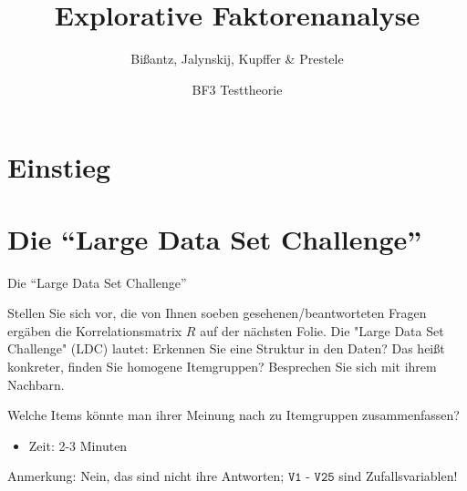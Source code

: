 \documentclass[
  ignorenonframetext,
]{beamer}
\title{Explorative Faktorenanalyse}
\subtitle{Bißantz, Jalynskij, Kupffer \& Prestele}
\author{BF3 Testtheorie}
\date{}
\providecommand{\tightlist}{%
  \setlength{\itemsep}{0pt}\setlength{\parskip}{0pt}}
\begin{document}
\frame{\titlepage}

\begin{frame}[allowframebreaks]
  \tableofcontents[hideallsubsections]
\end{frame}
\hypertarget{einstieg}{%
\section*{Einstieg}\label{einstieg}}


\hypertarget{die-large-data-set-challenge}{%
\section{Die ``Large Data Set
Challenge''}\label{die-large-data-set-challenge}}

\begin{frame}{Die ``Large Data Set Challenge''}
\begin{example}
Stellen Sie sich vor, die von Ihnen soeben gesehenen/beantworteten Fragen
ergäben die Korrelationsmatrix $R$ auf der nächsten Folie. Die "Large Data Set
Challenge" (LDC) lautet: Erkennen Sie eine Struktur in den Daten? Das heißt
konkreter, finden Sie homogene Itemgruppen? Besprechen Sie sich mit ihrem
Nachbarn.
\end{example}

Welche Items könnte man ihrer Meinung nach zu Itemgruppen
zusammenfassen?

\begin{itemize}
\tightlist
\item
  Zeit: 2-3 Minuten
\end{itemize}

Anmerkung: Nein, das sind nicht ihre Antworten; \(\texttt{V1 - V25}\)
sind Zufallsvariablen!
\end{frame}
\end{document}

